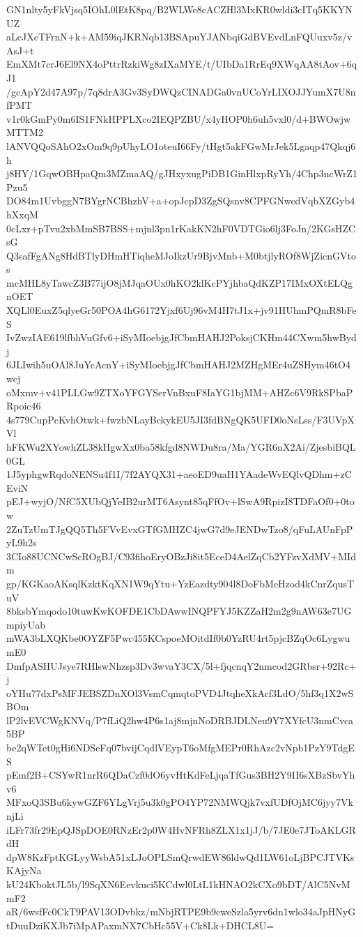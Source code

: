 GN1nlty5yFkVjsq5IOhL0lEtK8pq/B2WLWe8cACZHl3MxKR0wldi3cITq5KKYNUZ
aLcJXcTFrnN+k+AM59iqJKRNqb13BSApuYJANbqiGdBVEvdLnFQUuxv5z/vAsJ+t
EmXMt7crJ6El9NX4oPttrRzkiWg8zIXaMYE/t/UIbDa1RrEq9XWqAA8tAov+6qJ1
/gcApY2d47A97p/7q8drA3Gv3SyDWQzCINADGa0vnUCoYrLIXOJJYumX7U8nfPMT
v1r0kGmPy0m6IS1FNkHPPLXco2IEQPZBU/x4yHOP0h6uh5vxl0/d+BWOwjwMTTM2
lANVQQoSAhO2xOm9q9pUhyLO1oteuI66Fy/tHgt5akFGwMrJek5Lgaqp47Qkqj6h
j8HY/1GqwOBHpaQm3MZmaAQ/gJHxyxugPiDB1GinHlxpRyYh/4Chp3ncWrZ1Pzu5
DO84m1UvbggN7BYgrNCBhzhV+a+opJcpD3ZgSQsnv8CPFGNwcdVqbXZGyb4hXxqM
0cLxr+pTvu2xbMmSB7BSS+mjnl3pn1rKakKN2hF0VDTGio6lj3FoJn/2KGsHZCsG
Q3safFgANg8HdBTlyDHmHTiqheMJoIkzUr9BjvMnb+M0btjlyROf8WjZicnGVtos
mcMHL8yTawcZ3B77ijO8jMJqaOUx0hKO2klKcPYjhbaQdKZP17IMxOXtELQgnOET
XQLl0EuxZ5qlyeGr50POA4hG6172Yjxf6Uj96vM4H7tJ1x+jv91HUhmPQmR8bFeS
IvZwzIAE619lfbhVuGfv6+iSyMIoebjgJfCbmHAHJ2PoksjCKHm44CXwm5hwBydj
6JLIwih5uOAl8JuYcAcnY+iSyMIoebjgJfCbmHAHJ2MZHgMEr4uZSHym46tO4wcj
oMxmv+v41PLLGw9ZTXoYFGYSerVnBxuF8IaYG1bjMM+AHZc6V9RkSPbaPRpoic46
4s779CupPcKvhOtwk+fwzbNLayBckykEU5JI3fdBNgQK5UFD0oNsLss/F3UVpXVl
hFKWu2XYowhZL38kHgwXx0ba58kfgd8NWDu8ra/Ma/YGR6nX2Ai/ZjesbiBQL0GL
1J5yphgwRqdoNENSu4f1I/7f2AYQX31+aeoED9uaH1YAadeWvEQlvQDhm+zCEviN
pEJ+wyjO/NfC5XUbQjYeIB2urMT6Asynt85qFfOv+lSwA9RpizI8TDFaOf0+0tow
2ZuTzUmTJgQQ5Th5FVvEvxGTfGMHZC4jwG7d9eJENDwTzo8/qFuLAUnFpPyL9h2s
3CIo88UCNCwScROgBJ/C93fihoEryOBzJi8it5EceD4AelZqCb2YFzvXdMV+MIdm
gp/KGKaoAKsqlKzktKqXN1W9qYtu+YzEazdty904l8DoFbMeHzod4kCnrZqusTuV
8bksbYmqodo10tuwKwKOFDE1CbDAwwINQPFYJ5KZZaH2m2g9nAW63e7UGmpiyUab
mWA3bLXQKbe0OYZF5Pwc455KCspoeMOitdIf0b0YzRU4rt5pjcBZqOc6LygwumE0
DmfpASHUJsye7RHlswNhzsp3Dv3wvaY3CX/5l+fjqcnqY2nmcod2GRbsr+92Rc+j
oYHu77dxPsMFJEBSZDnXOl3VsmCqmqtoPVD4JtqheXkAcf3LdO/5hf3q1X2wSBOm
lP2lvEVCWgKNVq/P7fLiQ2hw4P6s1aj8mjnNoDRBJDLNeu9Y7XYfcU3nmCvca5BP
be2qWTet0gHi6NDSeFq07bvijCqdlVEypT6oMfgMEPr0RhAzc2vNpb1PzY9TdgES
pEmf2B+CSYwR1nrR6QDaCzf0dO6yvHtKdFeLjqaTfGus3BH2Y9II6sXBzSbvYhv6
MFxoQ3SBu6kywGZF6YLgVrj5u3k0gPO4YP72NMWQjk7vxfUDfOjMC6jyy7VknjLi
iLFr73fr29EpQJSpDOE0RNzEr2p0W4HvNFRh8ZLX1x1jJ/b/7JE0e7JToAKLGRdH
dpW8KzFptKGLyyWsbA51xLJoOPLSmQrwdEW86ldwQd1LW61oLjBPCJTVKsKAjyNa
kU24KboktJL5b/l9SqXN6Eevkuci5KCdwl0LtL1kHNAO2kCXo9bDT/AlC5NvMmF2
aR/6wsfFc0CkT9PAV13ODvbkz/mNbjRTPE9b9cweSzla5yrv6dn1wlo34aJpHNyG
tDuuDziKXJb7iMpAPaxmNX7CbHc55V+Ck8Lk+DHCL8U=
